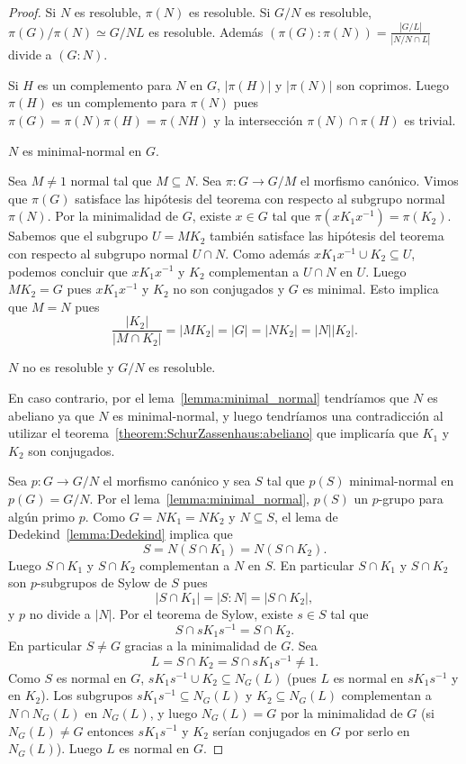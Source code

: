 \begin{proof}
	Si $N$ es resoluble, $\pi(N)$ es resoluble. Si $G/N$ es resoluble,
	$\pi(G)/\pi(N)\simeq G/NL$ es resoluble. Además
	$(\pi(G):\pi(N))=\frac{|G/L|}{|N/N\cap L|}$ divide a $(G:N)$. 
	
	Si $H$ es un complemento para $N$ en $G$, $|\pi(H)|$ y $|\pi(N)|$ son
	coprimos. Luego $\pi(H)$ es un complemento para $\pi(N)$ pues
	$\pi(G)=\pi(N)\pi(H)=\pi(NH)$ y la intersección
	$\pi(N)\cap\pi(H)$ es trivial.

	\begin{claim}
		$N$ es minimal-normal en $G$.
	\end{claim}

	Sea $M\ne1$ normal tal que $M\subseteq N$. Sea $\pi\colon G\to G/M$ el
	morfismo canónico. Vimos que $\pi(G)$ satisface las hipótesis del teorema
	con respecto al subgrupo normal $\pi(N)$. Por la minimalidad de $G$, existe
	$x\in G$ tal que $\pi(xK_1x^{-1})=\pi(K_2)$. Sabemos que el subgrupo
	$U=MK_2$ también satisface las hipótesis del teorema con respecto al
	subgrupo normal $U\cap N$. Como además $xK_1x^{-1}\cup K_2\subseteq U$,
	podemos concluir que $xK_1x^{-1}$ y $K_2$ complementan a $U\cap N$ en $U$.
	Luego $MK_2=G$ pues $xK_1x^{-1}$ y $K_2$ no son conjugados y $G$ es
	minimal. Esto implica que $M=N$ pues 
	\[
		\frac{|K_2|}{|M\cap K_2|}=|MK_2|=|G|=|NK_2|=|N||K_2|.
	\]

	\begin{claim}
		$N$ no es resoluble y $G/N$ es resoluble. 
	\end{claim}
	
	En caso contrario, por el lema~\ref{lemma:minimal_normal} tendríamos que
	$N$ es abeliano ya que $N$ es minimal-normal, y luego tendríamos una
	contradicción al utilizar el teorema~\ref{theorem:SchurZassenhaus:abeliano}
	que implicaría que $K_1$ y $K_2$ son conjugados.

	\medskip
	Sea $p\colon G\to G/N$ el morfismo canónico y sea $S$ tal que $p(S)$
	minimal-normal en $p(G)=G/N$.  Por el lema~\ref{lemma:minimal_normal},
	$p(S)$ un $p$-grupo para algún primo $p$.  Como $G=NK_1=NK_2$ y $N\subseteq
	S$, el lema de Dedekind~\ref{lemma:Dedekind} implica que
	\[
	S=N(S\cap K_1)=N(S\cap K_2).
	\]
	Luego $S\cap K_1$ y $S\cap K_2$
	complementan a $N$ en $S$. En particular $S\cap K_1$ y $S\cap K_2$ son
	$p$-subgrupos de Sylow de $S$ pues 
	\[
		|S\cap K_1|=|S:N|=|S\cap K_2|,
	\]
	y $p$ no divide a $|N|$. 	
	Por el teorema de Sylow, existe $s\in
	S$ tal que \[
	S\cap sK_1s^{-1}=S\cap K_2.
	\]
	En particular $S\ne G$ gracias a la minimalidad de $G$.
	Sea 
	\[
		L=S\cap K_2=S\cap sK_1s^{-1}\ne1.
	\]
	Como $S$ es normal en $G$, $sK_1s^{-1}\cup K_2\subseteq N_G(L)$ (pues $L$
	es normal en $sK_1s^{-1}$ y en $K_2$). Los subgrupos $sK_1s^{-1}\subseteq
	N_G(L)$ y $K_2\subseteq N_G(L)$ complementan a $N\cap N_G(L)$ en $N_G(L)$, y luego
	$N_G(L)=G$ por la minimalidad de $G$ (si $N_G(L)\ne G$ entonces
	$sK_1s^{-1}$ y $K_2$ serían conjugados en $G$ por serlo en $N_G(L)$). Luego
	$L$ es normal en $G$. 
	

\end{proof}
